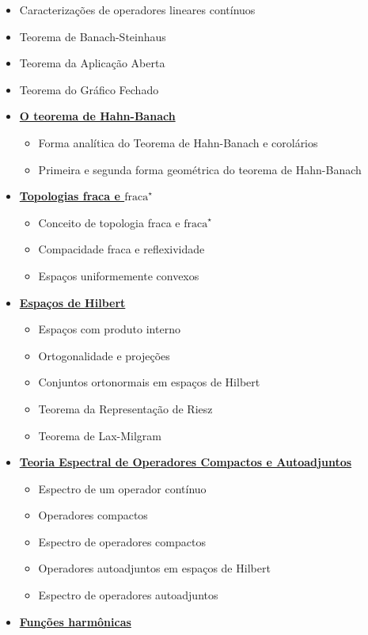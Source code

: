 \begin{itemize}
  \item Caracterizações de operadores lineares contínuos
  \item Teorema de Banach-Steinhaus
  \item Teorema da Aplicação Aberta
  \item Teorema do Gráfico Fechado
  \item \underline{\textbf{O teorema de Hahn-Banach}}
  \begin{itemize}
    \item Forma analítica do Teorema de Hahn-Banach e corolários
    \item Primeira e segunda forma geométrica do teorema de Hahn-Banach
  \end{itemize}
  \item \underline{\textbf{Topologias fraca e $\text{fraca}^{\star}$}}
  \begin{itemize}
    \item Conceito de topologia fraca e $\text{fraca}^{\star}$
    \item Compacidade fraca e reflexividade
    \item Espaços uniformemente convexos
  \end{itemize}
  \item \underline{\textbf{Espaços de Hilbert}}
  \begin{itemize}
    \item Espaços com produto interno
    \item Ortogonalidade e projeções
    \item Conjuntos ortonormais em espaços de Hilbert
    \item Teorema da Representação de Riesz
    \item Teorema de Lax-Milgram
  \end{itemize}
  \item \underline{\textbf{ Teoria Espectral de Operadores Compactos e Autoadjuntos}}
  \begin{itemize}
    \item Espectro de um operador contínuo
    \item Operadores compactos
    \item Espectro de operadores compactos
    \item Operadores autoadjuntos em espaços de Hilbert
    \item Espectro de operadores autoadjuntos
  \end{itemize}
  \item \underline{\textbf{ Funções harmônicas}}

\end{itemize}
